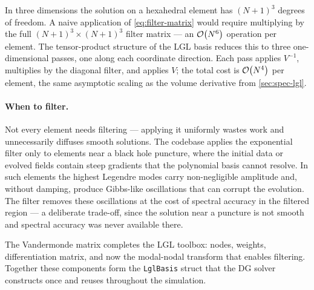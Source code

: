 In three dimensions the solution on a hexahedral element has
$(N+1)^3$ degrees of freedom.  A naive application of
\cref{eq:filter-matrix} would require multiplying by the full
$(N+1)^3 \times (N+1)^3$ filter matrix --- an $\mathcal{O}\!\left(N^6\right)$ operation
per element.  The tensor-product structure of the LGL basis reduces
this to three one-dimensional passes, one along each coordinate
direction.  Each pass applies $V^{-1}$, multiplies by the diagonal
filter, and applies $V$; the total cost is $\mathcal{O}\!\left(N^4\right)$ per element,
the same asymptotic scaling as the volume derivative from
\cref{sec:spec-lgl}.

\paragraph{When to filter.}

Not every element needs filtering --- applying it uniformly wastes
work and unnecessarily diffuses smooth solutions.  The codebase
applies the exponential filter only to elements near a black hole
puncture, where the initial data or evolved fields contain steep
gradients that the polynomial basis cannot resolve.  In such
elements the highest Legendre modes carry non-negligible amplitude
and, without damping, produce Gibbs-like oscillations that can
corrupt the evolution.  The filter removes these oscillations at the
cost of spectral accuracy in the filtered region --- a deliberate
trade-off, since the solution near a puncture is not smooth and
spectral accuracy was never available there.

The Vandermonde matrix completes the LGL toolbox: nodes, weights,
differentiation matrix, and now the modal-nodal transform that
enables filtering.  Together these components form the
\texttt{LglBasis} struct that the DG solver constructs once and reuses
throughout the simulation.
